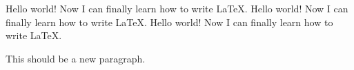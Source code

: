 \documentclass{article}
\begin{document}
  Hello world! Now I can finally learn how to write LaTeX. Hello world! Now I can finally learn how to write LaTeX. Hello world! Now I can finally learn how to write LaTeX.

  This should be a new paragraph.
\end{document}
